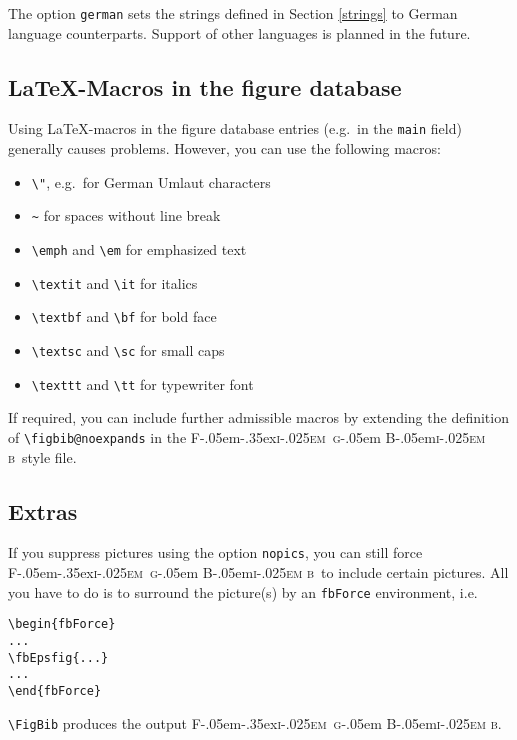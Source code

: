 \documentclass{ltxdoc}
\def\FigBib{{\rmfamily F\kern-.05em\lower-.35ex\hbox{\textsc{i\kern-.025em g}}\kern-.05em%
    B\kern-.05em\textsc{i\kern-.025em b}}}
\begin{document}
The option \texttt{german} sets the strings defined in Section
\ref{strings} to German language counterparts. Support of other
languages is planned in the future.

\subsection{\LaTeX-Macros in the figure database}

Using \LaTeX-macros in the figure database entries (e.g.\ in the
\texttt{main} field) generally causes problems. However, you can
use the following macros:
\begin{itemize}
\item\verb+\"+, e.g.\ for German Umlaut characters
\item\verb+~+ for spaces without line break
\item\verb+\emph+ and \verb+\em+ for emphasized text
\item\verb+\textit+ and \verb+\it+ for italics
\item\verb+\textbf+ and \verb+\bf+ for bold face
\item\verb+\textsc+ and \verb+\sc+ for small caps
\item\verb+\texttt+ and \verb+\tt+ for typewriter font
\end{itemize}
If required, you can include further admissible macros by
extending the definition of \verb+\figbib@noexpands+ in the
\FigBib\ style file.

\subsection{Extras}

If you suppress pictures using the option \texttt{nopics}, you can
still force \FigBib\ to include certain pictures. All you have to
do is to surround the picture(s) by an \texttt{fbForce}
environment, i.e.
\begin{verbatim}
\begin{fbForce}
...
\fbEpsfig{...}
...
\end{fbForce}
\end{verbatim}

\DescribeMacro{\FigBib}
\verb+\FigBib+ produces the output \FigBib.
\end{document}
